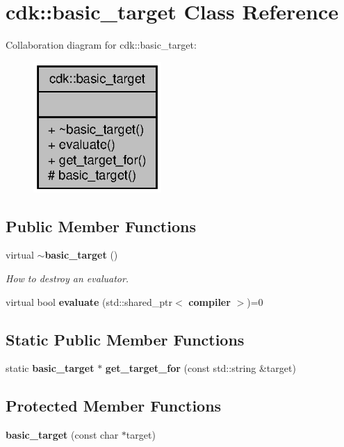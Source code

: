 \section{cdk\+:\+:basic\+\_\+target Class Reference}
\label{classcdk_1_1basic__target}


Collaboration diagram for cdk\+:\+:basic\+\_\+target\+:
\nopagebreak
\begin{figure}[H]
\begin{center}
\leavevmode
\includegraphics[width=138pt]{classcdk_1_1basic__target__coll__graph}
\end{center}
\end{figure}
\subsection*{Public Member Functions}
\begin{DoxyCompactItemize}
\item 
\mbox{\label{classcdk_1_1basic__target_aaa74cb39cf10b2735b1abc15680898fa}} 
virtual \textbf{ $\sim$basic\+\_\+target} ()
\begin{DoxyCompactList}\small\item\em How to destroy an evaluator. \end{DoxyCompactList}\item 
virtual bool \textbf{ evaluate} (std\+::shared\+\_\+ptr$<$ \textbf{ compiler} $>$)=0
\end{DoxyCompactItemize}
\subsection*{Static Public Member Functions}
\begin{DoxyCompactItemize}
\item 
static \textbf{ basic\+\_\+target} $\ast$ \textbf{ get\+\_\+target\+\_\+for} (const std\+::string \&target)
\end{DoxyCompactItemize}
\subsection*{Protected Member Functions}
\begin{DoxyCompactItemize}
\item 
\mbox{\label{classcdk_1_1basic__target_a789431eed534e3827eb2686ed00f30b8}} 
{\bfseries basic\+\_\+target} (const char $\ast$target)
\end{DoxyCompactItemize}


